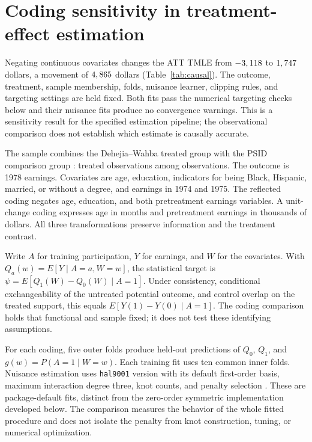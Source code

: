 \documentclass[11pt]{article}
\theoremstyle{definition}
\theoremstyle{remark}
\begin{document}
\section{Coding sensitivity in treatment-effect estimation}\label{sec:causal}

Negating continuous covariates changes the ATT TMLE from
$-3,118$ to $1,747$ dollars, a movement of
$4,865$ dollars (Table~\ref{tab:causal}). The outcome, treatment,
sample membership, folds, nuisance learner, clipping rules, and targeting
settings are held fixed. Both fits pass the numerical targeting checks
below and their nuisance fits produce no convergence warnings. This is a
sensitivity result for the specified estimation pipeline; the observational
comparison does not establish which estimate is causally accurate.

The sample combines the Dehejia--Wahba treated group with the PSID comparison
group \citep{lalonde1986,dehejia1999}: \CausalTreated{} treated observations
among \CausalN{} observations. The outcome is 1978 earnings. Covariates are
age, education, indicators for being Black, Hispanic, married, or without
a degree, and earnings in 1974 and 1975. The reflected coding negates age,
education, and both pretreatment earnings variables. A unit-change coding
expresses age in months and pretreatment earnings in thousands of dollars.
All three transformations preserve information and the treatment contrast.

Write $A$ for training participation, $Y$ for earnings, and $W$ for the
covariates. With $Q_a(w)=E[Y\mid A=a,W=w]$, the statistical target is
$\psi=E[Q_1(W)-Q_0(W)\mid A=1]$. Under consistency, conditional
exchangeability of the untreated potential outcome, and control overlap
on the treated support, this equals $E[Y(1)-Y(0)\mid A=1]$.
The coding comparison holds that functional and sample fixed; it does not
test these identifying assumptions.

For each coding, five outer folds produce held-out predictions of
$Q_0$, $Q_1$, and $g(w)=P(A=1\mid W=w)$.
Each training fit uses ten common inner folds. Nuisance estimation uses
\texttt{hal9001} version \HalVersion{} with its default first-order basis,
maximum interaction degree three, knot counts, and penalty selection
\citep{hejazi2020}. These are package-default fits, distinct from the
zero-order symmetric implementation developed below. The comparison measures
the behavior of the whole fitted procedure and does not isolate the
penalty from knot construction, tuning, or numerical optimization.
\end{document}
